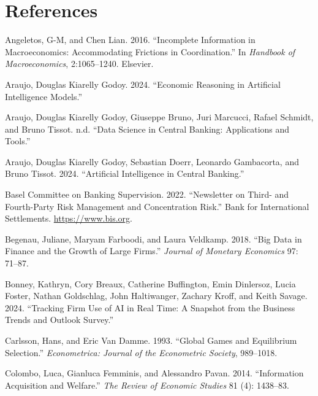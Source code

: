 \documentclass[
]{article}
\newlength{\cslhangindent}
\newenvironment{CSLReferences}[2] %
 {\begin{list}{}{%
  \setlength{\itemindent}{0pt}
  \setlength{\leftmargin}{0pt}
  \setlength{\parsep}{0pt}
  \ifodd #1
   \setlength{\leftmargin}{\cslhangindent}
   \setlength{\itemindent}{-1\cslhangindent}
  \fi
  \setlength{\itemsep}{#2\baselineskip}}}
 {\end{list}}
\theoremstyle{plain}
\theoremstyle{remark}
\begin{document}
\section*{References}\label{references}

\label{refs}
\begin{CSLReferences}{1}{0}
Angeletos, G-M, and Chen Lian. 2016. {``Incomplete Information in
Macroeconomics: Accommodating Frictions in Coordination.''} In
\emph{Handbook of Macroeconomics}, 2:1065--1240. Elsevier.

Araujo, Douglas Kiarelly Godoy. 2024. {``Economic Reasoning in
Artificial Intelligence Models.''}

Araujo, Douglas Kiarelly Godoy, Giuseppe Bruno, Juri Marcucci, Rafael
Schmidt, and Bruno Tissot. n.d. {``Data Science in Central Banking:
Applications and Tools.''}

Araujo, Douglas Kiarelly Godoy, Sebastian Doerr, Leonardo Gambacorta,
and Bruno Tissot. 2024. {``Artificial Intelligence in Central
Banking.''}

Basel Committee on Banking Supervision. 2022. {``{Newsletter on Third-
and Fourth-Party Risk Management and Concentration Risk}.''} {Bank for
International Settlements}. \url{https://www.bis.org}.

Begenau, Juliane, Maryam Farboodi, and Laura Veldkamp. 2018. {``Big Data
in Finance and the Growth of Large Firms.''} \emph{Journal of Monetary
Economics} 97: 71--87.

Bonney, Kathryn, Cory Breaux, Catherine Buffington, Emin Dinlersoz,
Lucia Foster, Nathan Goldschlag, John Haltiwanger, Zachary Kroff, and
Keith Savage. 2024. {``Tracking Firm Use of AI in Real Time: A Snapshot
from the Business Trends and Outlook Survey.''}

Carlsson, Hans, and Eric Van Damme. 1993. {``Global Games and
Equilibrium Selection.''} \emph{Econometrica: Journal of the Econometric
Society}, 989--1018.

Colombo, Luca, Gianluca Femminis, and Alessandro Pavan. 2014.
{``Information Acquisition and Welfare.''} \emph{The Review of Economic
Studies} 81 (4): 1438--83.


\end{CSLReferences}
\end{document}
